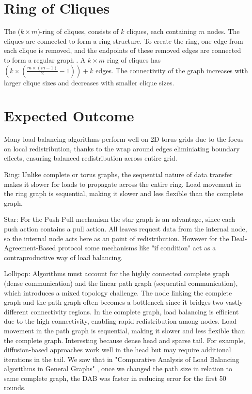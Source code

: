 \section{Ring of Cliques}\label{sec:2ringofcliquegraph}
The ($k \times m$)-ring of cliques, consists of $k$ cliques, each containing $m$ nodes. The cliques are connected to form a ring structure. To create the ring, one edge from each clique is removed, and the endpoints of these removed edges are connected to form a regular graph \cite{Mahlmann2010}. A $k \times m$ ring of cliques has $\left( k\times \left(\frac{m\times (m - 1)}{2}-1 \right) \right) +k$ edges. The connectivity of the graph increases with larger clique sizes and decreases with smaller clique sizes.

\section{Expected Outcome}\label{sec:expectedoutcome}
Many load balancing algorithms perform well on 2D torus grids due to the focus on local redistribution, thanks to the wrap around edges eliminiating boundary effects, ensuring balanced redistribution across entire grid.

Ring: Unlike complete or torus graphs, the sequential nature of data transfer makes it slower for loads to propagate across the entire ring. Load movement in the ring graph is sequential, making it slower and less flexible than the complete graph.

Star: For the Push-Pull mechanism the star graph is an advantage, since each push action contains a pull action. All leaves request data from the internal node, so the internal node acts here as an point of redistribution. However for the Deal-Agreement-Based protocol some mechanisms like "if condition" act as a contraproductive way of load balancing.

Lollipop: Algorithms must account for the highly connected complete graph (dense communication) and the linear path graph (sequential communication), which introduces a mixed topology challenge. The node linking the complete graph and the path graph often becomes a bottleneck since it bridges two vastly different connectivity regions. In the complete graph, load balancing is efficient due to the high connectivity, enabling rapid redistribution among nodes. Load movement in the path graph is sequential, making it slower and less flexible than the complete graph. Interesting because dense head and sparse tail.  For example, diffusion-based approaches work well in the head but may require additional iterations in the tail. We saw that in "Comparative Analysis of Load Balancing algorithms in General Graphs" \cite{Bayazitoglu}, once we changed the path size in relation to same complete graph, the DAB was faster in reducing error for the first 50 rounds. 

